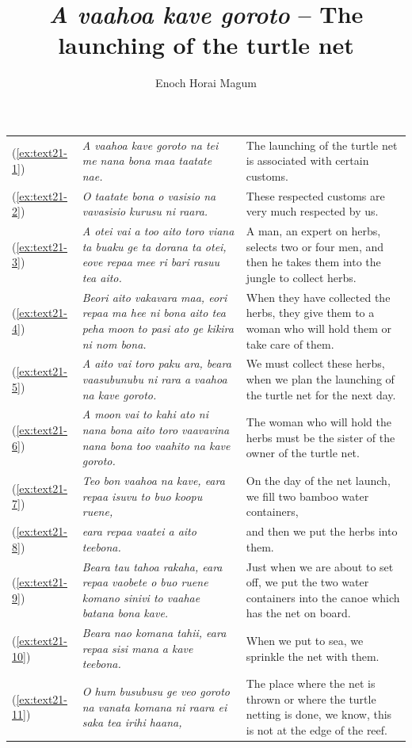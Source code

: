 \documentclass[output=paper]{langscibook}
\title{\textit{A vaahoa kave goroto} – The launching of the turtle net}
\author{Enoch Horai Magum}
\begin{document}
\maketitle\label{chap:28}
\begin{xltabular}{\textwidth}{lXX}
	(\ref{ex:text21-1})&\textit{A vaahoa kave goroto na tei me nana bona maa taatate nae.}&The launching of the turtle net is associated with certain customs.\\
	(\ref{ex:text21-2})&\textit{O taatate bona o vasisio na vavasisio kurusu ni raara.}&These respected customs are very much respected by us.\\
	(\ref{ex:text21-3})&\textit{A otei vai a too aito toro viana ta buaku ge ta dorana ta otei, eove repaa mee ri bari rasuu tea aito.}&A man, an expert on herbs, selects two or four men, and then he takes them into the jungle to collect herbs.\\
	(\ref{ex:text21-4})&\textit{Beori aito vakavara maa, eori repaa ma hee ni bona aito tea peha moon to pasi ato ge kikira ni nom bona.}&When they have collected the herbs, they give them to a woman who will hold them or take care of them.\\
	(\ref{ex:text21-5})&\textit{A aito vai toro paku ara, beara vaasubunubu ni rara a vaahoa na kave goroto.}&We must collect these herbs, when we plan the launching of the turtle net for the next day.\\
	(\ref{ex:text21-6})&\textit{A moon vai to kahi ato ni nana bona aito toro vaavavina nana bona too vaahito na kave goroto.}&The woman who will hold the herbs must be the sister of the owner of the turtle net.\\
	(\ref{ex:text21-7})&\textit{Teo bon vaahoa na kave, eara repaa isuvu to buo koopu ruene,}&On the day of the net launch, we fill two bamboo water containers,\\
	(\ref{ex:text21-8})&\textit{eara repaa vaatei a aito teebona.}&and then we put the herbs into them.\\
	(\ref{ex:text21-9})&\textit{Beara tau tahoa rakaha, eara repaa vaobete o buo ruene komano sinivi to vaahae batana bona kave.}&Just when we are about to set off, we put the two water containers into the canoe which has the net on board.\\
	(\ref{ex:text21-10})&\textit{Beara nao komana tahii, eara repaa sisi mana a kave teebona.}&When we put to sea, we sprinkle the net with them.\\
	(\ref{ex:text21-11})&\textit{O hum busubusu ge veo goroto na vanata komana ni raara ei saka tea irihi haana,}&The place where the net is thrown or where the turtle netting is done, we know, this is not at the edge of the reef.\\

\end{xltabular}
\end{document}

